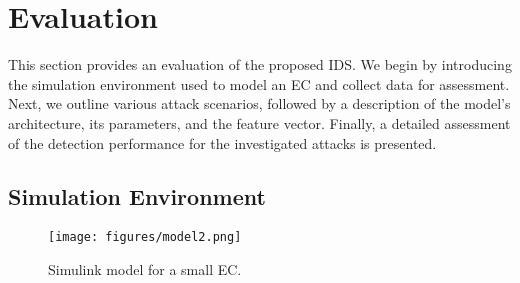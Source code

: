 \section{Evaluation}

This section provides an evaluation of the proposed IDS. We begin by introducing the simulation environment used to model an EC and collect data for assessment. Next, we outline various attack scenarios, followed by a description of the model's architecture, its parameters, and the feature vector. Finally, a detailed assessment of the detection performance for the investigated attacks is presented.

\subsection{Simulation Environment}

\begin{figure}[htbp!] 
\centering
\texttt{[image: figures/model2.png]}
\caption{Simulink model for a small EC.}
\label{fig:model}
\end{figure}

